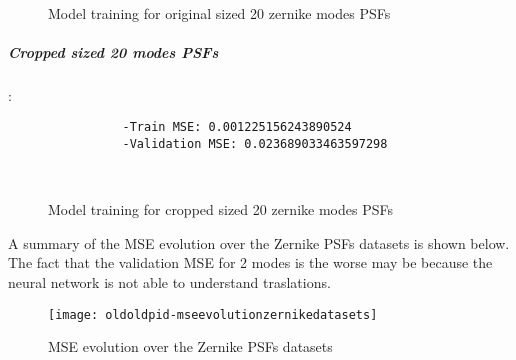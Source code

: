 		\begin{figure*}[ht!]
			\hspace{\fill}
			\hspace{\fill}
			\\
			\caption{Model training for original sized 20 zernike modes PSFs}
		\end{figure*}
		\FloatBarrier
		
		\subparagraph{Cropped sized 20 modes PSFs}:\\
		\begin{lstlisting}	
        		-Train MSE: 0.001225156243890524
        		-Validation MSE: 0.023689033463597298
		\end{lstlisting}
		
		\begin{figure*}[ht!]
			\hspace{\fill}
			\hspace{\fill}
			\\
			\caption{Model training for cropped sized 20 zernike modes PSFs}
		\end{figure*}
		\FloatBarrier
		
		A summary of the MSE evolution over the Zernike PSFs datasets is shown below. The fact that the validation MSE for 2 modes is the worse may be because the neural network is not able to understand traslations.
		\begin{figure*}[ht!]
			\centering
			\texttt{[image: oldoldpid-mseevolutionzernikedatasets]}
			\caption{MSE evolution over the Zernike PSFs datasets}
		\end{figure*}
		
		\FloatBarrier